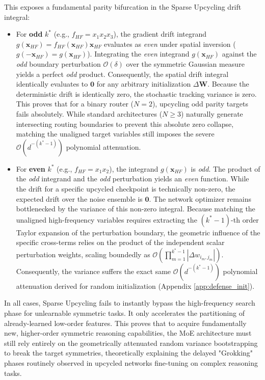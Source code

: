 \documentclass{article}
\newcommand{\1}{\mathbb{I}}
\newcommand{\calO}{\mathcal{O}}
\newcommand{\bx}{\mathbf{x}}
\newcommand{\bW}{\mathbf{W}}
\begin{document}
This exposes a fundamental parity bifurcation in the Sparse Upcycling drift integral:
\begin{itemize}[leftmargin=2em]
    \item For \textbf{odd} $k^*$ (e.g., $f_{HF} = x_1 x_2 x_3$), the gradient drift integrand $g(\bx_{HF}) = f_{HF}(\bx_{HF}) \bx_{HF}$ evaluates as \textit{even} under spatial inversion ($g(-\bx_{HF}) = g(\bx_{HF})$). Integrating the \textit{even} integrand $g(\bx_{HF})$ against the \textit{odd} boundary perturbation $\calO(\delta)$ over the symmetric Gaussian measure yields a perfect \textit{odd} product. Consequently, the spatial drift integral identically evaluates to $\mathbf{0}$ for any arbitrary initialization $\Delta \bW$. Because the deterministic drift is identically zero, the stochastic tracking variance is zero. This proves that for a binary router ($N=2$), upcycling odd parity targets fails absolutely. While standard architectures ($N \ge 3$) naturally generate intersecting routing boundaries to prevent this absolute zero collapse, matching the unaligned target variables still imposes the severe $\calO(d^{-(k^*-1)})$ polynomial attenuation.
    \item For \textbf{even} $k^*$ (e.g., $f_{HF} = x_1 x_2$), the integrand $g(\bx_{HF})$ is \textit{odd}. The product of the \textit{odd} integrand and the \textit{odd} perturbation yields an \textit{even} function. While the drift for a specific upcycled checkpoint is technically non-zero, the expected drift over the noise ensemble is $\mathbf{0}$. The network optimizer remains bottlenecked by the variance of this non-zero integral. Because matching the unaligned high-frequency variables requires extracting the $(k^*-1)$-th order Taylor expansion of the perturbation boundary, the geometric influence of the specific cross-terms relies on the product of the independent scalar perturbation weights, scaling boundedly as $\calO(\prod_{m=1}^{k^*-1} |\Delta w_{i_m, j_m}|)$. Consequently, the variance suffers the exact same $\calO(d^{-(k^*-1)})$ polynomial attenuation derived for random initialization (Appendix \ref{app:defense_init}).
\end{itemize}

In all cases, Sparse Upcycling fails to instantly bypass the high-frequency search phase for unlearnable symmetric tasks. It only accelerates the partitioning of already-learned low-order features. This proves that to acquire fundamentally new, higher-order symmetric reasoning capabilities, the MoE architecture must still rely entirely on the geometrically attenuated random variance bootstrapping to break the target symmetries, theoretically explaining the delayed "Grokking" phases \citep{grokking2022} routinely observed in upcycled networks fine-tuning on complex reasoning tasks.
\end{document}
